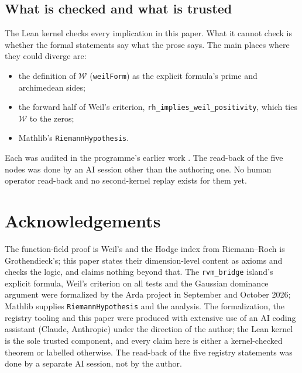 \documentclass[11pt]{article}
\theoremstyle{definition}
\newcommand{\lean}[1]{\texttt{#1}}
\newcommand{\Weil}{\mathcal{W}}
\begin{document}
\subsection{What is checked and what is trusted}

The Lean kernel checks every implication in this paper. What it cannot check is whether the formal statements say what the prose says. The main places where they could diverge are:
\begin{itemize}[leftmargin=*]
\item the definition of $\Weil$ (\lean{weilForm}) as the explicit formula's prime and archimedean sides;
\item the forward half of Weil's criterion, \lean{rh\_implies\_weil\_positivity}, which ties $\Weil$ to the zeros;
\item Mathlib's \lean{RiemannHypothesis}.
\end{itemize}
Each was audited in the programme's earlier work \cite{RHLean}. The read-back of the five nodes was done by an AI session other than the authoring one. No human operator read-back and no second-kernel replay exists for them yet.

\section*{Acknowledgements}

The function-field proof is Weil's and the Hodge index from Riemann--Roch is Grothendieck's; this paper states their dimension-level content as axioms and checks the logic, and claims nothing beyond that. The \lean{rvm\_bridge} island's explicit formula, Weil's criterion on all tests and the Gaussian dominance argument were formalized by the Arda project in September and October 2026; Mathlib supplies \lean{RiemannHypothesis} and the analysis. The formalization, the registry tooling and this paper were produced with extensive use of an AI coding assistant (Claude, Anthropic) under the direction of the author; the Lean kernel is the sole trusted component, and every claim here is either a kernel-checked theorem or labelled otherwise. The read-back of the five registry statements was done by a separate AI session, not by the author.
\end{document}
